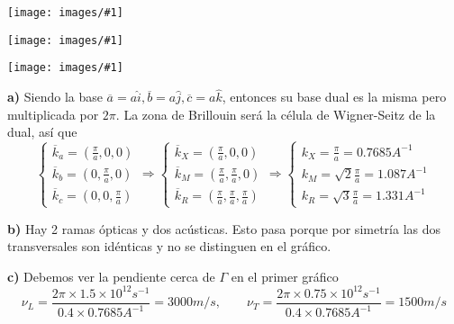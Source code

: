 \documentclass[leqno]{article}
\newcommand{\incimg}[1]{%
\center
\texttt{[image: images/\#1]}
}
\begin{document}
\begin{minipage}{0.40\textwidth}
  \incimg{prob2_15_1.png}
\end{minipage}
\begin{minipage}{0.30\textwidth}
  \incimg{prob2_15_3.png}
\end{minipage}
\begin{minipage}{0.30\textwidth}
  \incimg{prob2_15_.png}
\end{minipage}

\textbf{a)} Siendo la base $\overline{a}=a \hat{i}, \overline{b}=a \hat{j}, \overline{c}= a \hat{k}$, entonces su base dual es la misma pero multiplicada por $2\pi$. La zona de Brillouin será la célula de Wigner-Seitz de la dual, así que 
\[
\begin{cases}
  \overline{k}_a = \left( \frac{\pi}{a}, 0, 0 \right) \\ 
  \overline{k}_b = \left( 0, \frac{\pi}{a}, 0 \right) \\
  \overline{k}_c = \left(0,0, \frac{\pi}{a}  \right)
\end{cases} \Rightarrow
\begin{cases}
  \overline{k}_X = \left( \frac{\pi}{a}, 0, 0 \right) \\ 
  \overline{k}_M = \left( \frac{\pi}{a}, \frac{\pi}{a}, 0 \right) \\
  \overline{k}_R = \left( \frac{\pi}{a}, \frac{\pi}{a}, \frac{\pi}{a} \right)
\end{cases} \Rightarrow 
\begin{cases}
  k_X = \frac{\pi}{a} = 0.7685A^{-1}\\
  k_M = \sqrt{2} \frac{\pi}{a} = 1.087A^{-1}\\
  k_R = \sqrt{3} \frac{\pi}{a} = 1.331A^{-1}
\end{cases}
\] 

\textbf{b)} Hay 2 ramas ópticas y dos acústicas. Esto pasa porque por simetría las dos transversales son idénticas y no se distinguen en el gráfico.

\textbf{c)} Debemos ver la pendiente cerca de $\Gamma $ en el primer gráfico
\[
\nu_L = \frac{2\pi \times 1.5\times 10^{12}s^{-1}}{0.4\times 0.7685 A^{-1}} = \boxed{3000m / s}, \qquad 
\nu_T = \frac{2\pi \times 0.75\times 10^{12}s^{-1}}{0.4\times 0.7685 A^{-1}} = \boxed{1500m / s}
\] 
\end{document}
